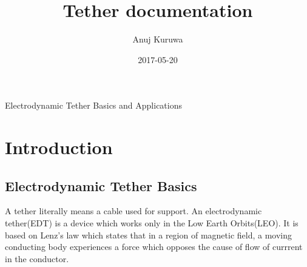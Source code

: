 \documentclass{article}
\title{Tether documentation}
\date{2017-05-20}
\author{Anuj Kuruwa}
\begin{document}
  \maketitle
  \newpage
Electrodynamic Tether Basics and Applications
\section{Introduction}
\subsection{Electrodynamic Tether Basics}
 A tether literally means a cable used for support. An electrodynamic tether(EDT) is a device 
which works only in the Low Earth Orbits(LEO). It is based on Lenz's law which states that
in a region of magnetic field, a moving conducting body experiences a force which opposes the cause 
of flow of currrent in the conductor.
\end{document}

